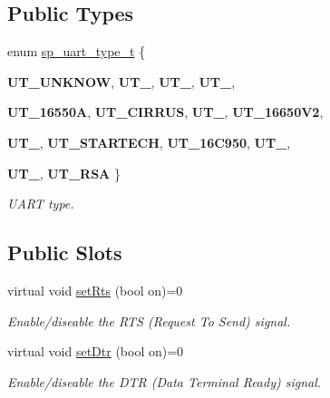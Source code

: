 \subsection*{Public Types}
\begin{DoxyCompactItemize}
\item 
enum \hyperlink{classmdt_abstract_serial_port_a56b107c57fb0acb17cfcca262abe6a54}{sp\_\-uart\_\-type\_\-t} \{ \par
{\bfseries UT\_\-UNKNOW}, 
{\bfseries UT\_}, 
{\bfseries UT\_}, 
{\bfseries UT\_}, 
\par
{\bfseries UT\_\-16550A}, 
{\bfseries UT\_\-CIRRUS}, 
{\bfseries UT\_}, 
{\bfseries UT\_\-16650V2}, 
\par
{\bfseries UT\_}, 
{\bfseries UT\_\-STARTECH}, 
{\bfseries UT\_\-16C950}, 
{\bfseries UT\_}, 
\par
{\bfseries UT\_}, 
{\bfseries UT\_\-RSA}
 \}
\begin{DoxyCompactList}\small\item\em UART type. \end{DoxyCompactList}\end{DoxyCompactItemize}
\subsection*{Public Slots}
\begin{DoxyCompactItemize}
\item 
virtual void \hyperlink{classmdt_abstract_serial_port_a0ef2426fbd1afbcb0701f327cc16a7cc}{setRts} (bool on)=0
\begin{DoxyCompactList}\small\item\em Enable/diseable the RTS (Request To Send) signal. \end{DoxyCompactList}\item 
virtual void \hyperlink{classmdt_abstract_serial_port_aa86a8bc0bb03ac2b07bf43968dfeb189}{setDtr} (bool on)=0
\begin{DoxyCompactList}\small\item\em Enable/diseable the DTR (Data Terminal Ready) signal. \end{DoxyCompactList}\end{DoxyCompactItemize}
